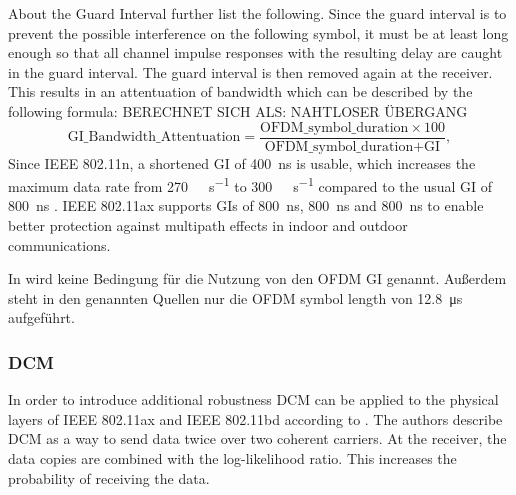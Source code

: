 About the Guard Interval \textcite{pulimamidi_development_2007} further list the following. 
Since the guard interval is to prevent the possible interference on the following symbol, it must be at least long enough so that all channel impulse responses with the resulting delay are caught in the guard interval. 
The guard interval is then removed again at the receiver. This results in an attentuation of bandwidth which can be described by the following formula: BERECHNET SICH ALS: NAHTLOSER ÜBERGANG 
\begin{equation}\label{eq:GI}
	\text{GI\_Bandwidth\_Attentuation} =
	\frac{
		\text{OFDM\_symbol\_duration} \times 100
	}{
		\text{OFDM\_symbol\_duration} + \text{GI}
	}
	,
\end{equation}
Since IEEE 802.11n, a shortened \ac{GI} of \SI{400}{\nano\second} is usable, which increases the maximum data rate from \SI{270}{\mega\bit\per\second} to \SI{300}{\mega\bit\per\second} compared to the usual \ac{GI} of \SI{800}{\nano\second} \cite{sauter_wireless_2022}.  IEEE 802.11ax supports \ac{GI}s of \SI{800}{\nano\second}, \SI{800}{\nano\second} and \SI{800}{\nano\second} to enable better protection against  multipath effects in indoor and outdoor communications. 

In \cite{alleAX} wird keine Bedingung für die Nutzung von den OFDM \ac{GI} genannt. Außerdem steht in den genannten Quellen nur die \ac{OFDM} symbol length von \SI{12.8}{\micro\second} aufgeführt.

\subsubsection*{\acl{DCM}}
In order to introduce additional robustness \ac{DCM} can be applied to the physical layers of IEEE 802.11ax and IEEE 802.11bd according to \textcite{jacob_system-level_2020}. The authors describe \ac{DCM} as a way to send data twice over two coherent carriers. At the receiver, the data copies are combined with the log-likelihood ratio. This increases the probability of receiving the data. 

